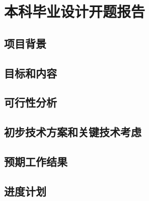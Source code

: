 \chapter{本科毕业设计开题报告}

\section{项目背景}

\section{目标和内容}

\section{可行性分析}

\section{初步技术方案和关键技术考虑}

\section{预期工作结果}

\section{进度计划} 
